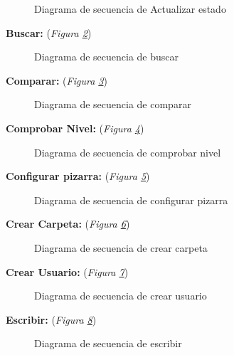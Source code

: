 \begin{figure}[H]
\centering
\seqActualizarEstado
\caption{Diagrama de secuencia de Actualizar estado}
\label{fig:seqActualizarEstado}
\end{figure}

\textbf{Buscar:} (\emph{Figura \ref{fig:seqBuscar}}) 

\begin{figure}[H]
\centering
\seqBuscar
\caption{Diagrama de secuencia de buscar}
\label{fig:seqBuscar}
\end{figure}

\textbf{Comparar:} (\emph{Figura \ref{fig:seqComparar}}) 

\begin{figure}[H]
\centering
\seqComparar
\caption{Diagrama de secuencia de comparar}
\label{fig:seqComparar}
\end{figure}

\textbf{Comprobar Nivel:} (\emph{Figura \ref{fig:seqComprobarNivel}}) 

\begin{figure}[H]
\centering
\seqComprobarNivel
\caption{Diagrama de secuencia de comprobar nivel}
\label{fig:seqComprobarNivel}
\end{figure}

\textbf{Configurar pizarra:} (\emph{Figura \ref{fig:seqConfigurarPizarra}}) 

\begin{figure}[H]
\centering
\seqConfigurarPizarra
\caption{Diagrama de secuencia de configurar pizarra}
\label{fig:seqConfigurarPizarra}
\end{figure}

\textbf{Crear Carpeta:} (\emph{Figura \ref{fig:seqCrearCarpeta}}) 

\begin{figure}[H]
\centering
\seqCrearCarpeta
\caption{Diagrama de secuencia de crear carpeta}
\label{fig:seqCrearCarpeta}
\end{figure}

\textbf{Crear Usuario:} (\emph{Figura \ref{fig:seqcrearusuario}}) 

\begin{figure}[H]
\centering
\seqCrearUsuario
\caption{Diagrama de secuencia de crear usuario}
\label{fig:seqcrearusuario}
\end{figure}

\textbf{Escribir:} (\emph{Figura \ref{fig:seqEscribir}}) 

\begin{figure}[H]
\centering
\seqEscribir
\caption{Diagrama de secuencia de escribir}
\label{fig:seqEscribir}
\end{figure}

